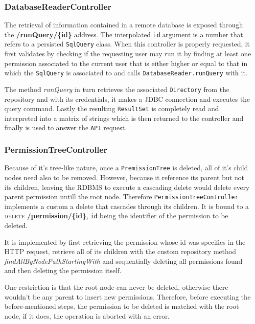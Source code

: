 

\subsubsection{DatabaseReaderController}
The retrieval of information contained in a remote database is exposed through the \textbf{/runQuery/\{id\}} address. The interpolated \texttt{id} argument is a number that refers to a persisted \texttt{SqlQuery} class. When this controller is properly requested, it first validates by checking if the requesting user may run it by finding at least one permission associated to the current user that is either higher or equal to that in which the \texttt{SqlQuery} is associated to and calls \texttt{DatabaseReader.runQuery} with it.

The method \textit{runQuery} in turn retrieves the associated \texttt{Directory} from the repository and with its credentials, it makes a \gls{JDBC} connection and executes the query command. Lastly the resulting \texttt{ResultSet} is completely read and interpreted into a matrix of strings which is then returned to the controller and finally is used to answer the \texttt{API} request.

\subsubsection{PermissionTreeController}
Because of it's tree-like nature, once a \texttt{PremissionTree} is deleted, all of it's child nodes need also to be removed. However, because it reference its parent but not its children, leaving the \gls{RDBMS} to execute a cascading delete would delete every parent permission untill the root node.
Therefore \texttt{PermissionTreeController} implements a custom a delete that cascades through its children. It is bound to a \textsc{delete} \textbf{/permission/\{id\}}, \texttt{id} being the identifier of the permission to be deleted.

It is implemented by first retrieving the permission whose id was specifies in the \gls{HTTP} request, retrieve all of its children with the custom repository method \textit{findAllByNodePathStartingWith} and sequentially deleting all permissions found and then deleting the permission itself.

One restriction is that the root node can never be deleted, otherwise there wouldn't be any parent to insert new permissions. Therefore, before executing the before-mentioned steps, the permission to be deleted is matched with the root node, if it does, the operation is aborted with an error.

